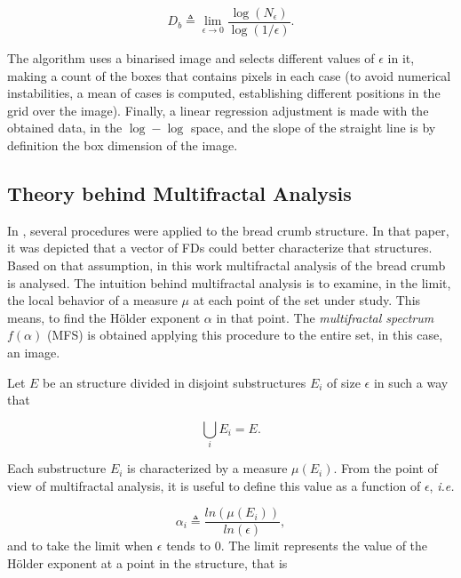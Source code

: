 \documentclass[a4paper,10pt]{article}
\begin{document}
\begin{equation}
D_{b} \triangleq \displaystyle\lim_{\epsilon \to 0}{\frac{\log(N_{\epsilon})}{\log (1/\epsilon)}}.
\end{equation}

The algorithm uses a binarised image and selects different values of $\epsilon$ in it, making a count of the boxes that contains pixels in each case (to avoid numerical instabilities, a mean of cases is computed, establishing different positions in the grid over the image). Finally, a linear regression adjustment is made with the obtained data, in the $\log-\log$ space, and the slope of the straight line is by definition the box dimension of the image. 

\subsection{Theory behind Multifractal Analysis}
\label{sec:4}

In \cite{Gonzales2008}, several procedures were applied to the bread crumb structure. In that paper, it was depicted that a vector of FDs could better characterize that structures. Based on that assumption, in this work multifractal analysis of the bread crumb is analysed. The intuition behind multifractal analysis is to examine, in the limit, the local behavior of a measure $\mu$ at each point of the set under study. This means, to find the H\"older exponent $\alpha$ in that point. The {\em multifractal spectrum} $f(\alpha)$ (MFS) is obtained applying this procedure to the entire set, in this case, an image.

Let $E$ be an structure divided in disjoint substructures $E_{i}$ of size $\epsilon$ in such a way that 

\begin{equation}
\displaystyle\bigcup_{i}E_{i} = E.
\end{equation}

Each substructure $E_{i}$ is characterized by a measure $\mu(E_{i})$. From the point of view of multifractal analysis, it is useful to define this value as a function of $\epsilon$, {\em i.e.}


\begin{equation}
\alpha_{i} \triangleq \frac{ln(\mu(E_{i}))}{ln(\epsilon)},
\label{eqn:eqn4}
\end{equation}
\noindent
and to take the limit when $\epsilon$ tends to $0$. The limit represents the value of the H\"older exponent at a point in the structure, that is
\end{document}
